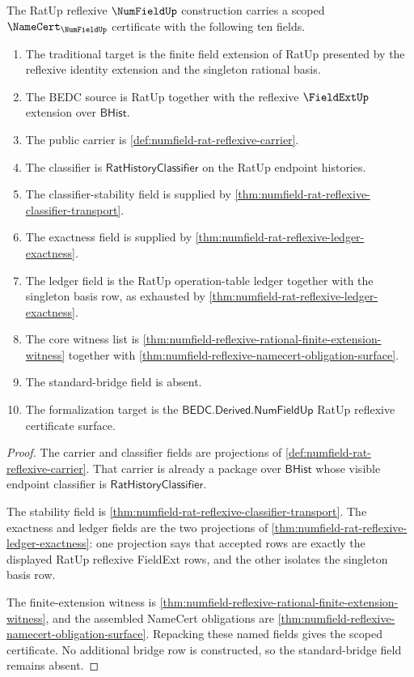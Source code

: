 \begin{theorem}
\label{thm:numfield-rat-reflexive-scoped-namecert-certificate}
The RatUp reflexive $\NumFieldUp$ construction carries a scoped
$\NameCert_{\NumFieldUp}$ certificate with the following ten fields.
\begin{enumerate}
\item The traditional target is the finite field extension of RatUp presented
by the reflexive identity extension and the singleton rational basis.
\item The BEDC source is RatUp together with the reflexive $\FieldExtUp$
extension over $\mathsf{BHist}$.
\item The public carrier is
\autoref{def:numfield-rat-reflexive-carrier}.
\item The classifier is $\mathsf{RatHistoryClassifier}$ on the RatUp endpoint
histories.
\item The classifier-stability field is supplied by
\autoref{thm:numfield-rat-reflexive-classifier-transport}.
\item The exactness field is supplied by
\autoref{thm:numfield-rat-reflexive-ledger-exactness}.
\item The ledger field is the RatUp operation-table ledger together with the
singleton basis row, as exhausted by
\autoref{thm:numfield-rat-reflexive-ledger-exactness}.
\item The core witness list is
\autoref{thm:numfield-reflexive-rational-finite-extension-witness} together
with \autoref{thm:numfield-reflexive-namecert-obligation-surface}.
\item The standard-bridge field is absent.
\item The formalization target is the
$\mathsf{BEDC.Derived.NumFieldUp}$ RatUp reflexive certificate surface.
\end{enumerate}
\end{theorem}
\begin{proof}
The carrier and classifier fields are projections of
\autoref{def:numfield-rat-reflexive-carrier}. That carrier is already a
package over $\mathsf{BHist}$ whose visible endpoint classifier is
$\mathsf{RatHistoryClassifier}$.

The stability field is
\autoref{thm:numfield-rat-reflexive-classifier-transport}. The exactness and
ledger fields are the two projections of
\autoref{thm:numfield-rat-reflexive-ledger-exactness}: one projection says
that accepted rows are exactly the displayed RatUp reflexive FieldExt rows,
and the other isolates the singleton basis row.

The finite-extension witness is
\autoref{thm:numfield-reflexive-rational-finite-extension-witness}, and the
assembled NameCert obligations are
\autoref{thm:numfield-reflexive-namecert-obligation-surface}. Repacking these
named fields gives the scoped certificate. No additional bridge row is
constructed, so the standard-bridge field remains absent.
\end{proof}

